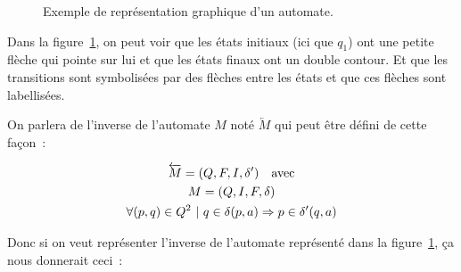 \begin{figure}[H]
    \centering
    \captionsetup{type=figure,justification=centering}
    \caption{
        Exemple de représentation graphique d'un automate.
    }\label{fig:automata}
\end{figure}

Dans la figure~\ref{fig:automata}, on peut voir que les états initiaux (ici que
\(q_1\)) ont une petite flèche qui pointe sur lui et que les états finaux ont
un double contour. Et que les transitions sont symbolisées par des flèches
entre les états et que ces flèches sont labellisées.

\vphantom{}

On parlera de l'inverse de l'automate \(M\) noté \(\overleftarrow{M}\) qui peut
être défini de cette façon~:

\begin{gather}
    \overleftarrow{M} = (Q, F, I, \delta') \quad \text{avec} \\
    M = (Q, I, F, \delta) \notag \\
    \forall (p, q) \in Q^2 ~|~ q \in \delta(p, a) \Rightarrow p \in \delta'(q, a) \notag
\end{gather}

Donc si on veut représenter l'inverse de l'automate représenté dans la
figure~\ref{fig:automata}, ça nous donnerait ceci~:

